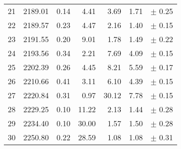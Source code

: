 \begin{table*}
\begin{tabular}{r|ccrrrc}
 21 &   2189.01 &    0.14 &    4.41 &    3.69 &    1.71 & $\pm$   0.25 \\
 22 &   2189.57 &    0.23 &    4.47 &    2.16 &    1.40 & $\pm$   0.15 \\
 23 &   2191.55 &    0.20 &    9.01 &    1.78 &    1.49 & $\pm$   0.22 \\
 24 &   2193.56 &    0.34 &    2.21 &    7.69 &    4.09 & $\pm$   0.15 \\
 25 &   2202.39 &    0.26 &    4.45 &    8.21 &    5.59 & $\pm$   0.17 \\
 26 &   2210.66 &    0.41 &    3.11 &    6.10 &    4.39 & $\pm$   0.15 \\
 27 &   2220.84 &    0.31 &    0.97 &   30.12 &    7.78 & $\pm$   0.15 \\
 28 &   2229.25 &    0.10 &   11.22 &    2.13 &    1.44 & $\pm$   0.28 \\
 29 &   2234.40 &    0.10 &   30.00 &    1.57 &    1.50 & $\pm$   0.28 \\
 30 &   2250.80 &    0.22 &   28.59 &    1.08 &    1.08 & $\pm$   0.31 \\
\hline
\end{tabular}
\end{table*}
